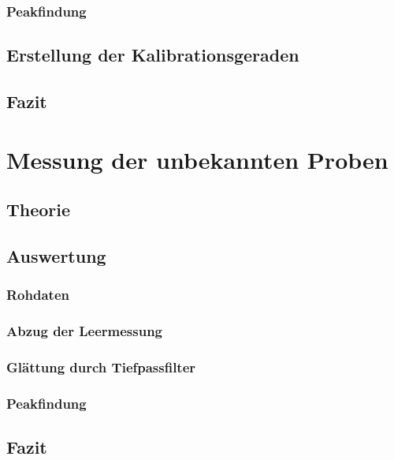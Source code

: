 \documentclass{../Misc/MontavonLaTeX/Montavon}
\begin{document}
\subsubsection{Peakfindung}


\subsection{Erstellung der Kalibrationsgeraden}

\begin{center}

\end{center}

\subsection{Fazit}


\section{Messung der unbekannten Proben}
\subsection{Theorie}

\subsection{Auswertung}
\subsubsection{Rohdaten}

\subsubsection{Abzug der Leermessung}

\subsubsection{Glättung durch Tiefpassfilter}

\subsubsection{Peakfindung}


\subsection{Fazit}
\end{document}
